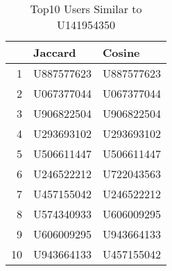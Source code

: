 \begin{table}[ht]
\centering
\caption{Top10 Users Similar to U141954350} 
\label{tab:top10}
\begin{tabular}{rll}
  \hline
 & Jaccard & Cosine \\ 
  \hline
1 & U887577623 & U887577623 \\ 
  2 & U067377044 & U067377044 \\ 
  3 & U906822504 & U906822504 \\ 
  4 & U293693102 & U293693102 \\ 
  5 & U506611447 & U506611447 \\ 
  6 & U246522212 & U722043563 \\ 
  7 & U457155042 & U246522212 \\ 
  8 & U574340933 & U606009295 \\ 
  9 & U606009295 & U943664133 \\ 
  10 & U943664133 & U457155042 \\ 
   \hline
\end{tabular}
\end{table}
